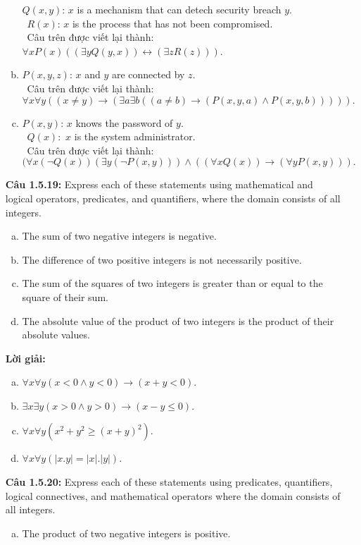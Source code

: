 \documentclass[a4paper]{article}
\begin{document}
\begin{enumerate}
\begin{enumerate}[a)]
$Q(x,y)$: $x$ is a mechanism that can detech security breach $y$. \\\
$R(x)$: $x$ is the process that has not been compromised. \\\
Câu trên được viết lại thành: $\forall x P(x) ((\exists yQ(y,x)) \leftrightarrow (\exists zR(z)))$.
\item $P(x,y,z)$: $x$ and $y$ are connected by $z$. \\\
Câu trên được viết lại thành: $\forall x \forall y ((x \neq y) \rightarrow (\exists a \exists b ((a \neq b) \rightarrow (P(x,y,a) \land P(x,y,b))))).$
\item $P(x,y)$: $x$ knows the password of $y$. \\\
$Q(x):$ $x$ is the system administrator. \\\
Câu trên được viết lại thành: $(\forall x (\lnot Q(x))(\exists y (\lnot P(x,y))) \land ((\forall xQ(x)) \rightarrow (\forall y P(x,y))).$
\end{enumerate} 
\textbf{Câu 1.5.19: }Express each of these statements using mathematical and logical operators, predicates, and quantifiers, where the domain consists of all integers.
\begin{enumerate}[a)]
\item The sum of two negative integers is negative.
\item The difference of two positive integers is not necessarily positive.
\item The sum of the squares of two integers is greater than or equal to the square of their sum.
\item The absolute value of the product of two integers is the product of their absolute values.
\end{enumerate}
\textbf{Lời giải: }
\begin{enumerate}[a)]
\item $\forall x\forall y (x < 0 \land y < 0) \rightarrow (x+y < 0)$.
\item $\exists x \exists y (x > 0 \land y > 0) \rightarrow (x-y \leq 0)$.
\item $\forall x \forall y(x^2+y^2 \geq (x+y)^2)$.
\item $\forall x \forall y(|x.y| = |x|.|y|)$.
\end{enumerate}
\textbf{Câu 1.5.20: }Express each of these statements using predicates, quantifiers, logical connectives, and mathematical operators where the domain consists of all integers.
\begin{enumerate}[a)]
\item The product of two negative integers is positive.

\end{enumerate}
\end{enumerate}
\end{document}

